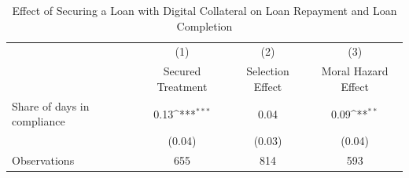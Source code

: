 \begin{table}[htbp]\centering
\def\sym#1{\ifmmode^{#1}\else\(^{#1}\)\fi}
\caption{Effect of Securing a Loan with Digital Collateral on Loan Repayment and Loan Completion\label{LASMH\_repay\_LATE\_100}}
\begin{tabular}{l*{3}{c}}
\toprule
                    &\multicolumn{1}{c}{(1)}&\multicolumn{1}{c}{(2)}&\multicolumn{1}{c}{(3)}\\
                    &\multicolumn{1}{c}{Secured Treatment}&\multicolumn{1}{c}{Selection Effect}&\multicolumn{1}{c}{Moral Hazard Effect}\\
\midrule
Share of days in compliance&        0.13\sym{***}&        0.04         &        0.09\sym{**} \\
                    &      (0.04)         &      (0.03)         &      (0.04)         \\
\midrule
Observations        &         655         &         814         &         593         \\
\bottomrule
\end{tabular}
\end{table}
